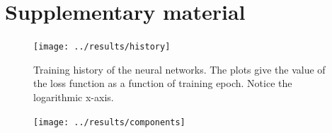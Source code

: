 \documentclass[preprint,5p]{elsarticle}
\begin{document}


\onecolumn
\appendix
\section{Supplementary material}

\begin{figure}[h]
	\centering
	\texttt{[image: ../results/history]}
	\caption{Training history of the neural networks. The plots give the value of the loss function as a function of training epoch. Notice the logarithmic x-axis.}
	\label{fig:history}
\end{figure}

\begin{figure}[h]
	\centering
	\texttt{[image: ../results/components]}
	\caption{}
	\label{fig:components}
\end{figure}
\end{document}

